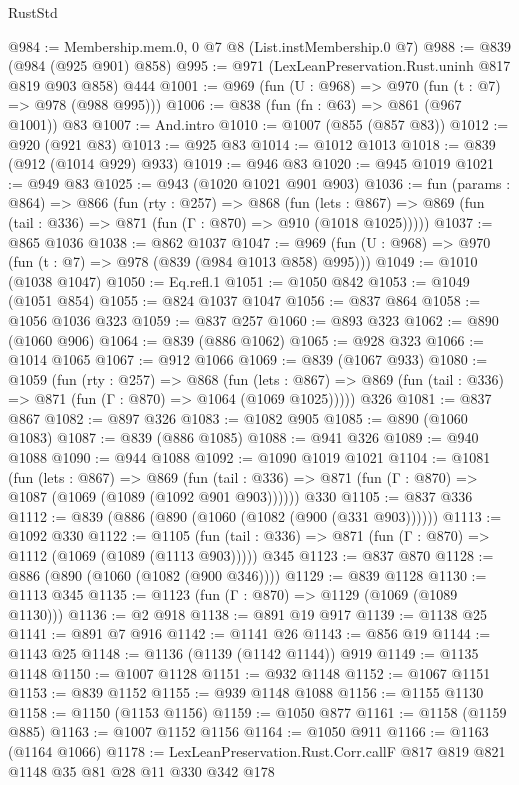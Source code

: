 \begin{lexlean}{RustStd}
\begin{coremodule}
{\begin{coremodule}
{{{{{{{{@984 := Membership.mem.{0, 0} @7 @8 (List.instMembership.{0} @7)
@988 := @839 (@984 (@925 @901) @858)
@995 := @971 (LexLeanPreservation.Rust.uninh @817 @819 @903 @858) @444
@1001 := @969 (fun (U : @968) => @970 (fun (t : @7) => @978 (@988 @995)))
@1006 := @838 (fun (fn : @63) => @861 (@967 @1001)) @83
@1007 := And.intro
@1010 := @1007 (@855 (@857 @83))
@1012 := @920 (@921 @83)
@1013 := @925 @83
@1014 := @1012 @1013
@1018 := @839 (@912 (@1014 @929) @933)
@1019 := @946 @83
@1020 := @945 @1019
@1021 := @949 @83
@1025 := @943 (@1020 @1021 @901 @903)
@1036 := fun (params : @864) =>
  @866
    (fun (rty : @257) =>
    @868
      (fun (lets : @867) =>
      @869 (fun (tail : @336) => @871 (fun (Γ : @870) => @910 (@1018 @1025)))))
@1037 := @865 @1036
@1038 := @862 @1037
@1047 := @969 (fun (U : @968) => @970 (fun (t : @7) => @978 (@839 (@984 @1013 @858) @995)))
@1049 := @1010 (@1038 @1047)
@1050 := Eq.refl.{1}
@1051 := @1050 @842
@1053 := @1049 (@1051 @854)
@1055 := @824 @1037 @1047
@1056 := @837 @864
@1058 := @1056 @1036 @323
@1059 := @837 @257
@1060 := @893 @323
@1062 := @890 (@1060 @906)
@1064 := @839 (@886 @1062)
@1065 := @928 @323
@1066 := @1014 @1065
@1067 := @912 @1066
@1069 := @839 (@1067 @933)
@1080 := @1059
    (fun (rty : @257) =>
    @868
      (fun (lets : @867) =>
      @869 (fun (tail : @336) => @871 (fun (Γ : @870) => @1064 (@1069 @1025)))))
    @326
@1081 := @837 @867
@1082 := @897 @326
@1083 := @1082 @905
@1085 := @890 (@1060 @1083)
@1087 := @839 (@886 @1085)
@1088 := @941 @326
@1089 := @940 @1088
@1090 := @944 @1088
@1092 := @1090 @1019 @1021
@1104 := @1081
    (fun (lets : @867) =>
    @869 (fun (tail : @336) => @871 (fun (Γ : @870) => @1087 (@1069 (@1089 (@1092 @901 @903))))))
    @330
@1105 := @837 @336
@1112 := @839 (@886 (@890 (@1060 (@1082 (@900 (@331 @903))))))
@1113 := @1092 @330
@1122 := @1105
    (fun (tail : @336) => @871 (fun (Γ : @870) => @1112 (@1069 (@1089 (@1113 @903)))))
    @345
@1123 := @837 @870
@1128 := @886 (@890 (@1060 (@1082 (@900 @346))))
@1129 := @839 @1128
@1130 := @1113 @345
@1135 := @1123 (fun (Γ : @870) => @1129 (@1069 (@1089 @1130)))
@1136 := @2 @918
@1138 := @891 @19 @917
@1139 := @1138 @25
@1141 := @891 @7 @916
@1142 := @1141 @26
@1143 := @856 @19
@1144 := @1143 @25
@1148 := @1136 (@1139 (@1142 @1144)) @919
@1149 := @1135 @1148
@1150 := @1007 @1128
@1151 := @932 @1148
@1152 := @1067 @1151
@1153 := @839 @1152
@1155 := @939 @1148 @1088
@1156 := @1155 @1130
@1158 := @1150 (@1153 @1156)
@1159 := @1050 @877
@1161 := @1158 (@1159 @885)
@1163 := @1007 @1152 @1156
@1164 := @1050 @911
@1166 := @1163 (@1164 @1066)
@1178 := LexLeanPreservation.Rust.Corr.callF @817 @819 @821 @1148 @35 @81 @28 @11 @330 @342 @178
}}}}}}}}
\end{coremodule}}
\end{coremodule}
\end{lexlean}
